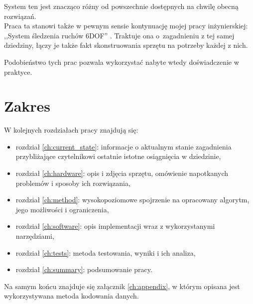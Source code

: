 System ten jest znacząco różny od powszechnie dostępnych na chwilę obecną rozwiązań.\\

Praca ta stanowi także w pewnym sensie kontynuację mojej pracy inżynierskiej: ,,System śledzenia ruchów 6DOF'' \cite{inz}.
Traktuje ona o~zagadnieniu z tej samej dziedziny, łączy je także fakt skonstruowania sprzętu na potrzeby każdej z nich.

Podobieństwo tych prac pozwala wykorzystać nabyte wtedy doświadczenie w praktyce.

\section{Zakres}

W kolejnych rozdziałach pracy znajdują się:
\begin{itemize}
 \item rozdział \ref{ch:current_state}: informacje o aktualnym stanie zagadnienia przybliżające czytelnikowi ostatnie istotne osiągnięcia w dziedzinie,
 \item rozdział \ref{ch:hardware}: opis i zdjęcia sprzętu, omówienie napotkanych problemów i sposoby ich rozwiązania,
 \item rozdział \ref{ch:method}: wysokopoziomowe spojrzenie na opracowany algorytm, jego możliwości i ograniczenia,
 \item rozdział \ref{ch:software}: opis implementacji wraz z wykorzystanymi narzędziami,
 \item rozdział \ref{ch:tests}: metoda testowania, wyniki i ich analiza,
 \item rozdział \ref{ch:summary}: podsumowanie pracy.
\end{itemize}

Na samym końcu znajduje się załącznik \ref{ch:appendix}, w którym opisana jest wykorzystywana metoda kodowania danych.
